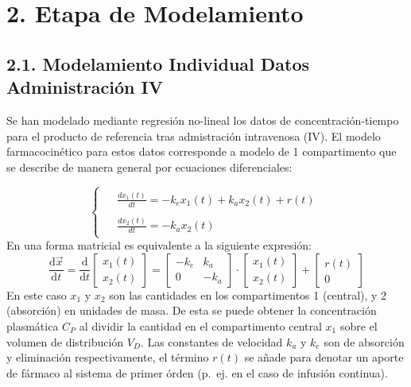 \documentclass[]{article}
\begin{document}
\section{2. Etapa de Modelamiento}\label{etapa-de-modelamiento}

\subsection{2.1. Modelamiento Individual Datos Administración
IV}\label{modelamiento-individual-datos-administracion-iv}

Se han modelado mediante regresión no-lineal los datos de
concentración-tiempo para el producto de referencia tras admistración
intravenosa (IV). El modelo farmacocinético para estos datos corresponde
a modelo de 1 compartimento que se describe de manera general por
ecuaciones diferenciales:

\[
\left\{\begin{matrix}
\begin{aligned}
&\frac{dx_{1}(t)}{dt} = -k_{e}x_{1}(t)+k_{a}x_{2}(t)+r(t) \\ 
\\
&\frac{dx_{2}(t)}{dt} = -k_{a}x_{2}(t) 
\end{aligned}
\end{matrix}\right.
\] En una forma matricial es equivalente a la siguiente expresión:\\
\[\frac{\mathrm{d} \vec{x}}{\mathrm{d} t} = \frac{\mathrm{d} }{\mathrm{d} t} \begin{bmatrix} x_{1}(t)\\ x_{2}(t) \end{bmatrix} = \begin{bmatrix} -k_{e} & k_{a} \\ 0 & -k_{a} \end{bmatrix} \cdot \begin{bmatrix}x_{1}(t)\\x_{2}(t)\end{bmatrix} + \begin{bmatrix}r(t)\\0\end{bmatrix}\]
En este caso \(x_{1}\) y \(x_{2}\) son las cantidades en los
compartimentos 1 (central), y 2 (absorción) en unidades de masa. De esta
se puede obtener la concentración plasmática \(C_{P}\) al dividir la
cantidad en el compartimento central \(x_{1}\) sobre el volumen de
distribución \(V_{D}\). Las constantes de velocidad \(k_{a}\) y
\(k_{e}\) son de absorción y eliminación respectivamente, el término
\(r(t)\) se añade para denotar un aporte de fármaco al sistema de primer
órden (p.~ej. en el caso de infusión continua).
\end{document}

